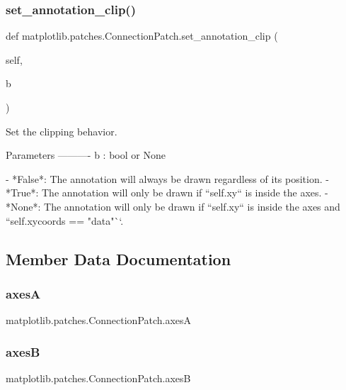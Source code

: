 \subsubsection{\texorpdfstring{set\+\_\+annotation\+\_\+clip()}{set\_annotation\_clip()}}
{\footnotesize\ttfamily def matplotlib.\+patches.\+Connection\+Patch.\+set\+\_\+annotation\+\_\+clip (\begin{DoxyParamCaption}\item[{}]{self,  }\item[{}]{b }\end{DoxyParamCaption})}

\begin{DoxyVerb}Set the clipping behavior.

Parameters
----------
b : bool or None

    - *False*: The annotation will always be drawn regardless of its
      position.
    - *True*: The annotation will only be drawn if ``self.xy`` is
      inside the axes.
    - *None*: The annotation will only be drawn if ``self.xy`` is
      inside the axes and  ``self.xycoords == "data"``.
\end{DoxyVerb}
 

\subsection{Member Data Documentation}
\mbox{\label{classmatplotlib_1_1patches_1_1ConnectionPatch_a5943bba0396030581a92ed5f92fcf5ff}} 
\subsubsection{\texorpdfstring{axesA}{axesA}}
{\footnotesize\ttfamily matplotlib.\+patches.\+Connection\+Patch.\+axesA}

\mbox{\label{classmatplotlib_1_1patches_1_1ConnectionPatch_a7c33301ad97b65e7bdc1cad339ff071f}} 
\subsubsection{\texorpdfstring{axesB}{axesB}}
{\footnotesize\ttfamily matplotlib.\+patches.\+Connection\+Patch.\+axesB}

